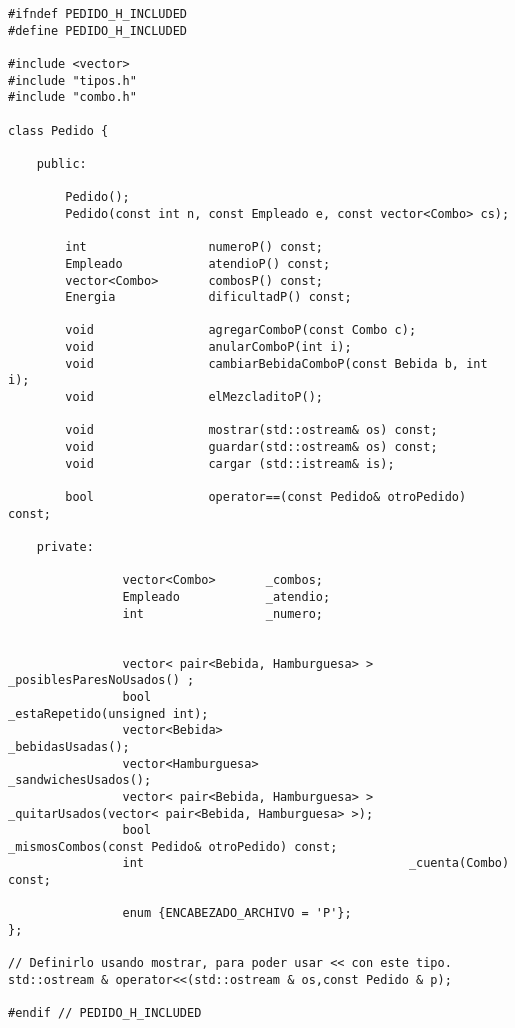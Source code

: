 \begin{lstlisting}
#ifndef PEDIDO_H_INCLUDED
#define PEDIDO_H_INCLUDED

#include <vector>
#include "tipos.h"
#include "combo.h"

class Pedido {

	public:

		Pedido();
		Pedido(const int n, const Empleado e, const vector<Combo> cs);
 
		int                 numeroP() const;
		Empleado            atendioP() const;
		vector<Combo>       combosP() const;
		Energia             dificultadP() const;

		void                agregarComboP(const Combo c);
		void                anularComboP(int i);
		void                cambiarBebidaComboP(const Bebida b, int i);
		void                elMezcladitoP();

		void                mostrar(std::ostream& os) const;
		void                guardar(std::ostream& os) const;
		void                cargar (std::istream& is);

		bool                operator==(const Pedido& otroPedido) const;

	private:

                vector<Combo>       _combos;
                Empleado            _atendio;
                int                 _numero;


                vector< pair<Bebida, Hamburguesa> >     _posiblesParesNoUsados() ;
                bool                                    _estaRepetido(unsigned int);
                vector<Bebida>                          _bebidasUsadas();
                vector<Hamburguesa>                     _sandwichesUsados();
                vector< pair<Bebida, Hamburguesa> >     _quitarUsados(vector< pair<Bebida, Hamburguesa> >);
                bool                                    _mismosCombos(const Pedido& otroPedido) const;
                int                                     _cuenta(Combo) const;

                enum {ENCABEZADO_ARCHIVO = 'P'};
};

// Definirlo usando mostrar, para poder usar << con este tipo.
std::ostream & operator<<(std::ostream & os,const Pedido & p);

#endif // PEDIDO_H_INCLUDED

\end{lstlisting}